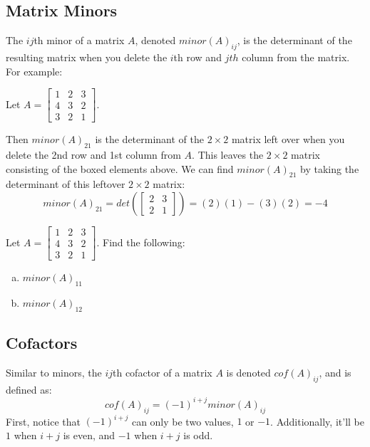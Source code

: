 \documentclass[11pt]{exam}
\begin{document}
    \vspace{20px}
    \subsection{Matrix Minors}
    The $ij$th minor of a matrix $A$, denoted $minor(A)_{ij}$, is the determinant of the resulting matrix when you delete the $i$th row and $jth$ column
    from the matrix. For example:

    Let $A = \begin{bmatrix} 1 & \boxed{2} & \boxed{3} \\ 4 & 3 & 2 \\ 3 & \boxed{2} & \boxed{1} \end{bmatrix}$.
    
    Then $minor(A)_{21}$ is the determinant of the $2 \times 2$ matrix left over when you delete the 2nd row and 1st column from $A$. This leaves
    the $2 \times 2$ matrix consisting of the boxed elements above. We can find $minor(A)_{21}$ by taking the determinant of this leftover $2 \times 2$
    matrix:
    $$minor(A)_{21} = det(\begin{bmatrix} 2 & 3 \\ 2 & 1 \end{bmatrix}) = (2)(1) - (3)(2) = -4$$

    \begin{questions}
        \item Let $A = \begin{bmatrix} 1 & 2 & 3 \\ 4 & 3 & 2 \\ 3 & 2 & 1 \end{bmatrix}$. Find the following:
        \begin{enumerate}[a.]
            \item $minor(A)_{11}$
            \item $minor(A)_{12}$
        \end{enumerate}
    \end{questions}

    \pagebreak
    \subsection{Cofactors}
    Similar to minors, the $ij$th cofactor of a matrix $A$ is denoted $cof(A)_{ij}$, and is defined as:
    $$cof(A)_{ij} = (-1)^{i+j} minor(A)_{ij}$$
    First, notice that $(-1)^{i+j}$ can only be two values, $1$ or $-1$. Additionally, it'll be $1$ when $i + j$ is even, and $-1$ when $i + j$ is odd.
\end{document}
